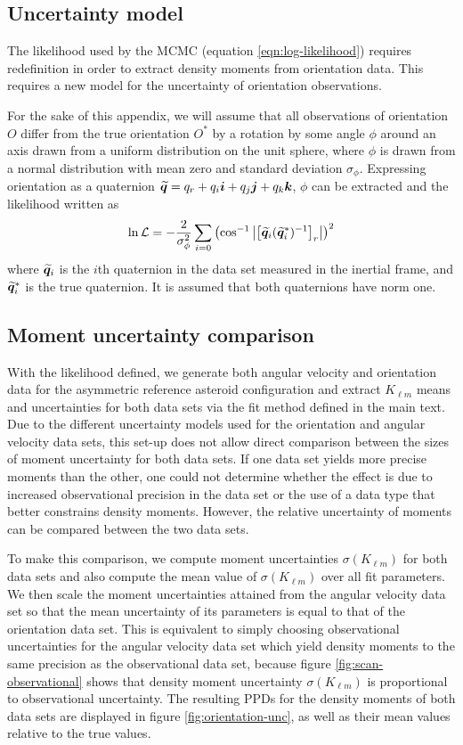 \subsection{Uncertainty model}
The likelihood used by the MCMC (equation \ref{eqn:log-likelihood}) requires redefinition in order to extract density moments from orientation data. This requires a new model for the uncertainty of orientation observations.

For the sake of this appendix, we will assume that all observations of orientation $O$ differ from the true orientation $O^*$ by a rotation by some angle $\phi$ around an axis drawn from a uniform distribution on the unit sphere, where $\phi$ is drawn from a normal distribution with mean zero and standard deviation $\sigma_\phi$. Expressing orientation as a quaternion $\widetilde{\bm{q}} = q_r + q_i \bm i + q_j \bm j + q_k \bm k$, $\phi$ can be extracted and the likelihood written as 
\begin{equation}
  \ln \mathcal{L} = -\frac{2}{\sigma_\phi^2}\sum_{i=0}\left( \cos^{-1}\left|\left[ \widetilde{\bm{q}}_i (\widetilde{\bm{q}}_i^*)^{-1} \right]_r\right| \right)^2
  \label{eqn:orientation-like}
\end{equation}
where $\widetilde{\bm{q}}_i$ is the $i$th quaternion in the data set measured in the inertial frame, and $\widetilde{\bm{q}}_i^*$ is the true quaternion. It is assumed that both quaternions have norm one.

\subsection{Moment uncertainty comparison}
With the likelihood defined, we generate both angular velocity and orientation data for the asymmetric reference asteroid configuration and extract $K_{\ell m}$ means and uncertainties for both data sets via the fit method defined in the main text. Due to the different uncertainty models used for the orientation and angular velocity data sets, this set-up does not allow direct comparison between the sizes of moment uncertainty for both data sets. If one data set yields more precise moments than the other, one could not determine whether the effect is due to increased observational precision in the data set or the use of a data type that better constrains density moments. However, the relative uncertainty of moments can be compared between the two data sets.

To make this comparison, we compute moment uncertainties $\sigma(K_{\ell m})$ for both data sets and also compute the mean value of $\sigma(K_{\ell m})$ over all fit parameters. We then scale the moment uncertainties attained from the angular velocity data set so that the mean uncertainty of its parameters is equal to that of the orientation data set. This is equivalent to simply choosing observational uncertainties for the angular velocity data set which yield density moments to the same precision as the observational data set, because figure \ref{fig:scan-observational} shows that density moment uncertainty $\sigma(K_{\ell m})$ is proportional to observational uncertainty. The resulting PPDs for the density moments of both data sets are displayed in figure \ref{fig:orientation-unc}, as well as their mean values relative to the true values.

